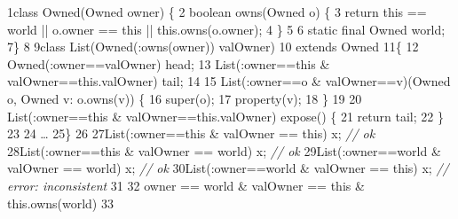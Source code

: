 \begin{tightcode}
\quad\num{1}class Owned(Owned owner) \{
\quad\num{2}    boolean owns(Owned o) \{
\quad\num{3}        return this == world || o.owner == this || this.owns(o.owner);
\quad\num{4}    \}
\quad\num{5}
\quad\num{6}    static final Owned world;
\quad\num{7}\}
\quad\num{8}
\quad\num{9}class List(Owned(:owns(owner)) valOwner)
\quad\num{10}    extends Owned
\quad\num{11}\{
\quad\num{12}    Owned(:owner==valOwner) head;
\quad\num{13}    List(:owner==this & valOwner==this.valOwner) tail;
\quad\num{14}
\quad\num{15}    List(:owner==o & valOwner==v)(Owned o, Owned v: o.owns(v)) \{
\quad\num{16}        super(o);
\quad\num{17}        property(v);
\quad\num{18}    \}
\quad\num{19}
\quad\num{20}    List(:owner==this & valOwner==this.valOwner) expose() \{
\quad\num{21}        return tail;
\quad\num{22}    \}
\quad\num{23}
\quad\num{24}    \ldots{}
\quad\num{25}\}
\quad\num{26}
\quad\num{27}List(:owner==this & valOwner == this) x;  \emph{// ok}
\quad\num{28}List(:owner==this & valOwner == world) x;  \emph{// ok}
\quad\num{29}List(:owner==world & valOwner == world) x;  \emph{// ok}
\quad\num{30}List(:owner==world & valOwner == this) x;  \emph{// error: inconsistent}
\quad\num{31}
\quad\num{32}        owner == world & valOwner == this & this.owns(world)
\quad\num{33}                                
\end{tightcode}
